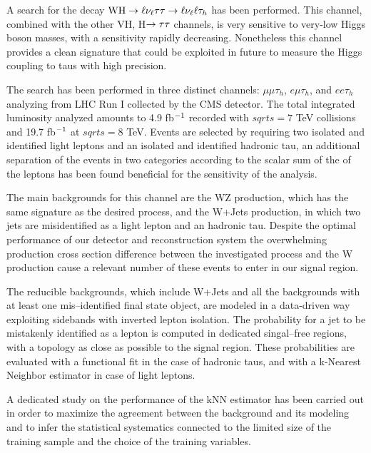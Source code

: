 A search for the decay $\mathrm{W}\mathrm{H}\rightarrow\ell\nu_\ell\tau\tau \rightarrow \ell \nu_\ell \ell \tau_h$ has been performed. This channel, combined with the other VH, H$\rightarrow\tau\tau$ channels, is very sensitive to very-low Higgs boson masses, with a sensitivity rapidly decreasing. Nonetheless this channel provides a clean signature that could be exploited in future to measure the Higgs coupling to taus with high precision. 

The search has been performed in three distinct channels: $\mu\mu\tau_h$, $e\mu\tau_h$, and $ee\tau_h$ analyzing from LHC Run I collected by the CMS detector. The total integrated luminosity analyzed amounts to 4.9 fb$^{-1}$ recorded with $sqrt{s} = 7$ TeV collisions and 19.7 fb$^{-1}$ at $sqrt{s} = 8$ TeV. Events are selected by requiring two isolated and identified light leptons and an isolated and identified hadronic tau, an additional separation of the events in two categories according to the scalar sum of the \pT of the leptons has been found beneficial for the sensitivity of the analysis. 

The main backgrounds for this channel are the WZ production, which has the same signature as the desired process, and the W+Jets production, in which two jets are misidentified as a light lepton and an hadronic tau. Despite the optimal performance of our detector and reconstruction system the overwhelming production cross section difference between the investigated process and the W production cause a relevant number of these events to enter in our signal region.

The reducible backgrounds, which include W+Jets and all the backgrounds with at least one mis--identified final state object, are modeled in a data-driven way exploiting sidebands with inverted lepton isolation. The probability for a jet to be mistakenly identified as a lepton is computed in dedicated singal--free regions, with a topology as close as possible to the signal region. These probabilities are evaluated with a functional fit in the case of hadronic taus, and with a k-Nearest Neighbor estimator in case of light leptons. 

A dedicated study on the performance of the kNN estimator has been carried out in order to maximize the agreement between the background and its modeling and to infer the statistical systematics connected to the limited size of the training sample and the choice of the training variables.


